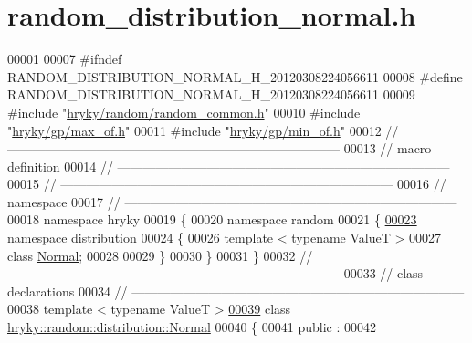 \hypertarget{random__distribution__normal_8h_source}{\section{random\-\_\-distribution\-\_\-normal.\-h}
}

\begin{DoxyCode}
00001 
00007 \textcolor{preprocessor}{#ifndef RANDOM\_DISTRIBUTION\_NORMAL\_H\_20120308224056611}
00008 \textcolor{preprocessor}{}\textcolor{preprocessor}{#define RANDOM\_DISTRIBUTION\_NORMAL\_H\_20120308224056611}
00009 \textcolor{preprocessor}{}\textcolor{preprocessor}{#include "\hyperlink{random__common_8h}{hryky/random/random_common.h}"}
00010 \textcolor{preprocessor}{#include "\hyperlink{max__of_8h}{hryky/gp/max_of.h}"}
00011 \textcolor{preprocessor}{#include "\hyperlink{min__of_8h}{hryky/gp/min_of.h}"}
00012 \textcolor{comment}{//
      ------------------------------------------------------------------------------}
00013 \textcolor{comment}{// macro definition}
00014 \textcolor{comment}{//
      ------------------------------------------------------------------------------}
00015 \textcolor{comment}{//
      ------------------------------------------------------------------------------}
00016 \textcolor{comment}{// namespace}
00017 \textcolor{comment}{//
      ------------------------------------------------------------------------------}
00018 \textcolor{keyword}{namespace }hryky
00019 \{
00020 \textcolor{keyword}{namespace }random
00021 \{
\hypertarget{random__distribution__normal_8h_source_l00023}{}\hyperlink{namespacehryky_1_1random_1_1distribution}{00023} \textcolor{keyword}{namespace }distribution
00024 \{
00026     \textcolor{keyword}{template} < \textcolor{keyword}{typename} ValueT >
00027     \textcolor{keyword}{class }\hyperlink{classhryky_1_1random_1_1distribution_1_1_normal}{Normal};
00028 
00029 \}
00030 \}
00031 \}
00032 \textcolor{comment}{//
      ------------------------------------------------------------------------------}
00033 \textcolor{comment}{// class declarations}
00034 \textcolor{comment}{//
      ------------------------------------------------------------------------------}
00038 \textcolor{comment}{}\textcolor{keyword}{template} < \textcolor{keyword}{typename} ValueT >
\hypertarget{random__distribution__normal_8h_source_l00039}{}\hyperlink{classhryky_1_1random_1_1distribution_1_1_normal}{00039} \textcolor{keyword}{class }\hyperlink{classhryky_1_1random_1_1distribution_1_1_normal}{hryky::random::distribution::Normal}
00040 \{
00041 \textcolor{keyword}{public} :
00042 

\end{DoxyCode}
